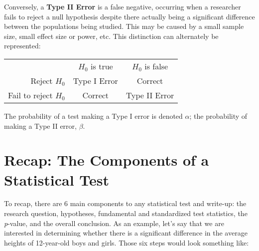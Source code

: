Conversely, a \textbf{Type II Error} is a false negative, occurring when a researcher fails to reject a null hypothesis despite there actually being a significant difference between the populations being studied. This may be caused by a small sample size, small effect size or power, etc. This distinction can alternately be represented:

\begin{center}
\begin{tabular}{|r c c|}
\hline
& $H_0$ is true & $H_0$ is false \\
 Reject $H_0$ & Type I Error & Correct\\
Fail to reject $H_0$ & Correct & Type II Error\\
\hline
\end{tabular}
\end{center}

The probability of a test making a Type I error is denoted $\alpha$; the probability of making a Type II error, $\beta$.

\section{Recap: The Components of a Statistical Test}

To recap, there are 6 main components to any statistical test and write-up: the research question, hypotheses, fundamental and standardized test statistics, the \textit{p}-value, and the overall conclusion. As an example, let's say that we are interested in determining whether there is a significant difference in the average heights of 12-year-old boys and girls. Those six steps would look something like:

